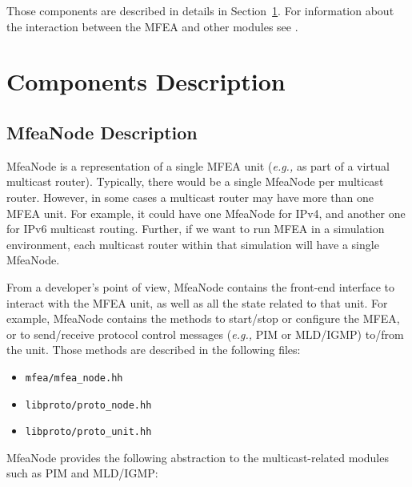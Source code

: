 \documentclass[11pt]{article}
\newcommand{\eg}{\emph{e.g.,}\xspace}
\begin{document}
Those components are described in details in
Section~\ref{sec:components_description}.
For information about the interaction between the MFEA and other modules see
\cite{xorp:multicast_arch}.

\section{Components Description}
\label{sec:components_description}


\subsection{MfeaNode Description}

MfeaNode is a representation of a single MFEA unit (\eg as part of a
virtual multicast router).
Typically, there would be a single MfeaNode per multicast router.
However, in some cases a multicast router may have more than one
MFEA unit. For example, it could have one MfeaNode for IPv4, and
another one for IPv6 multicast routing. Further, if we want to
run MFEA in a simulation environment, each multicast router within that
simulation will have a single MfeaNode.

From a developer's point of view, MfeaNode contains the front-end interface
to interact with the MFEA unit, as well as all the state
related to that unit. For example, MfeaNode contains the methods to
start/stop or configure the MFEA, or to send/receive protocol control
messages (\eg PIM or MLD/IGMP) to/from the unit. Those methods are
described in the following files:

\begin{itemize}
  \item \verb=mfea/mfea_node.hh=
  \item \verb=libproto/proto_node.hh=
  \item \verb=libproto/proto_unit.hh=
\end{itemize}

MfeaNode provides the following abstraction to the multicast-related
modules such as PIM and MLD/IGMP:
\end{document}
